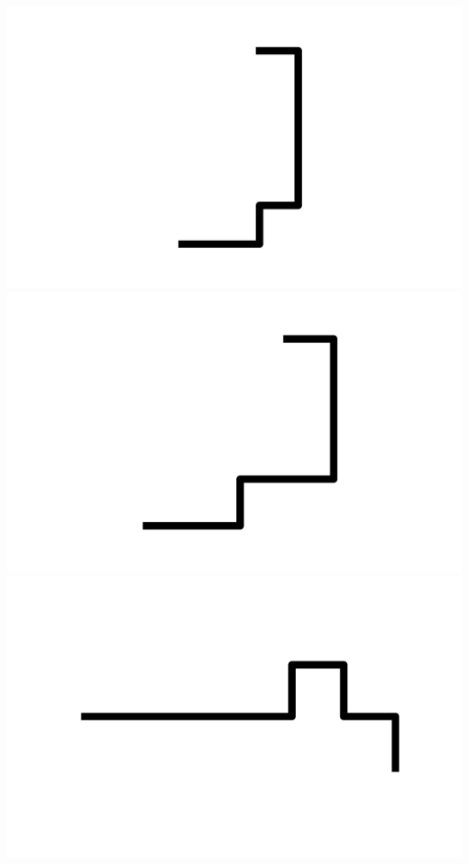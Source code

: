 \documentclass[]{report}
\begin{document}
\includegraphics[scale=.1]{pictures/21/state_cluster_shapes_436.pdf} 
\includegraphics[scale=.1]{pictures/21/state_cluster_shapes_437.pdf} 
\includegraphics[scale=.1]{pictures/21/state_cluster_shapes_438.pdf} 
\end{document}
